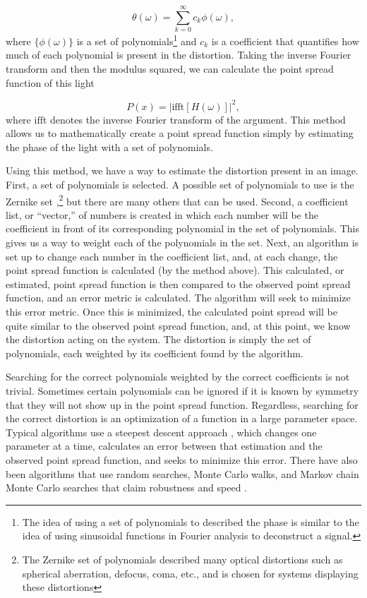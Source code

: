 \begin{equation}
  \theta (\omega) = \sum _{k=0} ^{\infty} c_k \phi (\omega),
  \label{phasesuma}
\end{equation}
%
where $\{\phi (\omega) \}$ is a set of polynomials\footnote{The idea of using a set of polynomials to described the phase is similar to the idea of using sinusoidal functions in Fourier analysis to deconstruct a signal.} and $c_k$ is a coefficient that quantifies how much of each polynomial is present in the distortion. Taking the inverse Fourier transform and then the modulus squared, we can calculate the point spread function of this light

\begin{equation}
		P(x) = \Big|\text{ifft}[H(\omega)]\Big|^2,
  \label{otftopsfa}
\end{equation}
%
where $\text{ifft}$ denotes the inverse Fourier transform of the argument. This method allows us to mathematically create a point spread function simply by estimating the phase of the light with a set of polynomials.

Using this method, we have a way to estimate the distortion present in an image. First, a set of polynomials is selected. A possible set of polynomials to use is the Zernike set \cite{Gonsalves1982},\footnote{The Zernike set of polynomials described many optical distortions such as spherical aberration, defocus, coma, etc., and is chosen for systems displaying these distortions} but there are many others that can be used. Second, a coefficient list, or ``vector,'' of numbers is created in which each number will be the coefficient in front of its corresponding polynomial in the set of polynomials. This gives us a way to weight each of the polynomials in the set. Next, an algorithm is set up to change each number in the coefficient list, and, at each change, the point spread function is calculated (by the method above). This calculated, or estimated, point spread function is then compared to the observed point spread function, and an error metric is calculated. The algorithm will seek to minimize this error metric. Once this is minimized, the calculated point spread will be quite similar to the observed point spread function, and, at this point, we know the distortion acting on the system. The distortion is simply the set of polynomials, each weighted by its coefficient found by the algorithm.


Searching for the correct polynomials weighted by the correct coefficients is not trivial. Sometimes certain polynomials can be ignored if it is known by symmetry that they will not show up in the point spread function. Regardless, searching for the correct distortion is an optimization of a function in a large parameter space. Typical algorithms use a steepest descent approach \cite{Gonsalves1982}, which changes one parameter at a time, calculates an error between that estimation and the observed point spread function, and seeks to minimize this error. There have also been algorithms that use random searches, Monte Carlo walks, and Markov chain Monte Carlo searches that claim robustness and speed \cite{fienup}.

